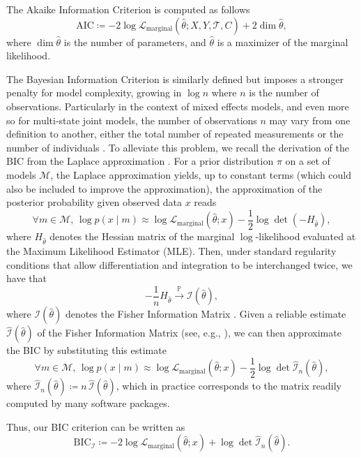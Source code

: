 \documentclass{sn-jnl}
\begin{document}
The Akaike Information Criterion is computed as follows
\[
    \mathrm{AIC} \coloneqq -2 \log \mathcal{L}_\mathrm{marginal}(\hat{\theta}; X, Y, \mathcal{T}, C) + 2 \dim \hat{\theta},
\]
where $\dim \hat{\theta}$ is the number of parameters, and $\hat{\theta}$ is a maximizer of the marginal likelihood.

The Bayesian Information Criterion is similarly defined but imposes a stronger penalty for model complexity, growing in $\log n$ where $n$ is the number of observations. Particularly in the context of mixed effects models, and even more so for multi-state joint models, the number of observations $n$ may vary from one definition to another, either the total number of repeated measurements or the number of individuals \citep{delattre2014note}. To alleviate this problem, we recall the derivation of the BIC from the Laplace approximation \citep{lebarbier2006introduction}. For a prior distribution $\pi$ on a set of models $\mathcal{M}$, the Laplace approximation yields, up to constant terms (which could also be included to improve the approximation), the approximation of the posterior probability given observed data $x$ reads
\[
    \forall m \in \mathcal{M}, \, \log p(x \mid m) \approx \log \mathcal{L}_\mathrm{marginal}(\hat{\theta}; x) - \frac{1}{2} \log \det(-H_{\hat{\theta}}),
\]
where $H_{\hat{\theta}}$ denotes the Hessian matrix of the marginal $\log$-likelihood evaluated at the Maximum Likelihood Estimator (MLE). Then, under standard regularity conditions that allow differentiation and integration to be interchanged twice, we have that
\[
    -\frac{1}{n} H_{\hat{\theta}} \overset{\mathbb{P}}{\to} \mathcal{I}(\hat{\theta}),
\]
where $\mathcal{I}(\hat{\theta})$ denotes the Fisher Information Matrix \citep{casella2001theory}. Given a reliable estimate $\widehat{\mathcal{I}}(\hat{\theta})$ of the Fisher Information Matrix (see, e.g., \citet{delattre2023computing}), we can then approximate the BIC by substituting this estimate
\[
    \forall m \in \mathcal{M}, \, \log p(x \mid m) \approx \log \mathcal{L}_\mathrm{marginal}(\hat{\theta}; x) - \frac{1}{2} \log \det \hat{\mathcal{I}}_n(\hat{\theta}),
\]
where $\hat{\mathcal{I}}_n(\hat{\theta}) \coloneqq n \, \hat{\mathcal{I}}(\hat{\theta})$, which in practice corresponds to the matrix readily computed by many software packages. 

Thus, our BIC criterion can be written as
\[
\mathrm{BIC}_\mathcal{I} \coloneqq -2 \log \mathcal{L}_\mathrm{marginal}(\hat{\theta}; x) + \log \det \hat{\mathcal{I}}_n(\hat{\theta}).
\]
\end{document}
